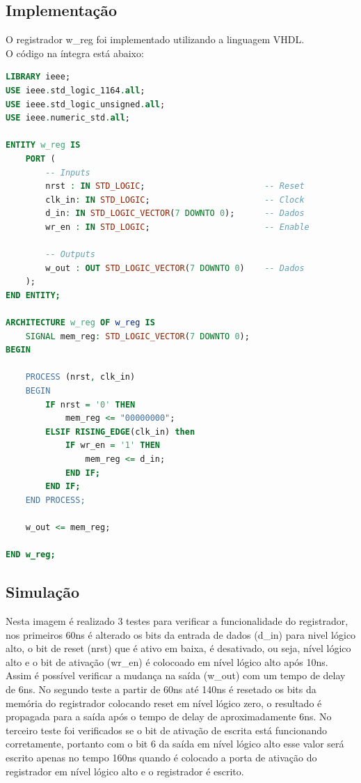 \documentclass{article}
\begin{document}
\subsection{Implementação}

O registrador w\_reg foi implementado utilizando a linguagem VHDL.\\

O código na íntegra está abaixo:\\

\begin{lstlisting}[language=VHDL, caption={Código VHDL w\_reg}]
    LIBRARY ieee;
USE ieee.std_logic_1164.all;
USE ieee.std_logic_unsigned.all;
USE ieee.numeric_std.all;

ENTITY w_reg IS
    PORT (
        -- Inputs
        nrst : IN STD_LOGIC;                        -- Reset
        clk_in: IN STD_LOGIC;                       -- Clock
        d_in: IN STD_LOGIC_VECTOR(7 DOWNTO 0);      -- Dados
        wr_en : IN STD_LOGIC;                       -- Enable

        -- Outputs
        w_out : OUT STD_LOGIC_VECTOR(7 DOWNTO 0)    -- Dados
    );
END ENTITY;

ARCHITECTURE w_reg OF w_reg IS
    SIGNAL mem_reg: STD_LOGIC_VECTOR(7 DOWNTO 0);
BEGIN

    PROCESS (nrst, clk_in)
    BEGIN
        IF nrst = '0' THEN
            mem_reg <= "00000000";
        ELSIF RISING_EDGE(clk_in) then
            IF wr_en = '1' THEN
                mem_reg <= d_in;
            END IF;
        END IF;
    END PROCESS;

    w_out <= mem_reg;

END w_reg;
\end{lstlisting}

\subsection{Simulação}

Nesta imagem é realizado 3 testes para verificar a funcionalidade do registrador, nos primeiros 60ns é alterado os bits da entrada de dados (d\_in) para nivel lógico alto, o bit de reset (nrst) que é ativo em baixa, é desativado, ou seja, nível lógico alto e o bit de ativação (wr\_en) é colocoado em nível lógico alto após 10ns. Assim é possível verificar a mudança na saída (w\_out) com um tempo de delay de 6ns. No segundo teste a partir de 60ns até 140ns é resetado os bits da memória do registrador colocando reset em nível lógico zero, o resultado é propagada para a saída após o tempo de delay de aproximadamente 6ns. No terceiro teste foi verificados se o bit de ativação de escrita está funcionando corretamente, portanto com o bit 6 da saída em nível lógico alto esse valor será escrito apenas no tempo 160ns quando é colocado a porta de ativação do registrador em nível lógico alto e o registrador é escrito.
\end{document}
